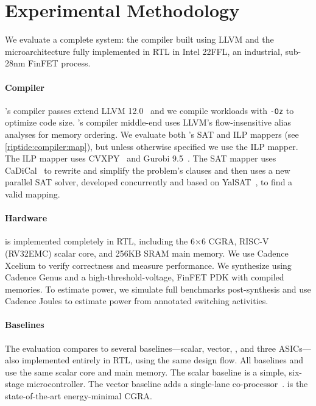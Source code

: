 \section{Experimental Methodology}
\label{riptide:method}

We evaluate a complete \riptide system: the compiler built using LLVM and the
microarchitecture fully implemented in RTL in Intel 22FFL,
an industrial, sub-28nm FinFET process.

\paragraph{Compiler}
\riptide's compiler passes extend LLVM 12.0~\cite{llvm} and we compile workloads with
\texttt{-Oz} to optimize code size.  
% 
\riptide's compiler middle-end uses LLVM's
flow-insensitive alias analyses for memory ordering.
%
We evaluate both \riptide's SAT and ILP mappers (see \autoref{riptide:compiler:map}), but unless otherwise specified we use the ILP mapper.
% 
The ILP mapper uses CVXPY~\cite{cvxpy} and Gurobi 9.5~\cite{gurobi}.
%
The SAT mapper uses CaDiCal~\cite{cadical} to rewrite and simplify the problem's clauses and then uses a new parallel SAT solver, developed concurrently and based on YalSAT~\cite{yalsat}, to find a valid mapping.

\paragraph{Hardware}
\label{method:hardware}
\riptide is implemented completely in RTL, including the 6$\times$6 CGRA, RISC-V
(RV32EMC) scalar core, and 256KB
SRAM main memory. 
% 
We use Cadence Xcelium to verify correctness and measure
performance.
% 
We synthesize \riptide using Cadence Genus and a
high-threshold-voltage, FinFET PDK with compiled memories.
% 
To estimate power, we simulate full benchmarks post-synthesis and use Cadence
Joules to estimate power from annotated switching activities.

\paragraph{Baselines}
The evaluation compares to several baselines---scalar, vector, \snafu, and
three ASICs---also implemented entirely in RTL, using the same design
flow.
% 
All baselines and \riptide use the same scalar core and main memory.
% 
The scalar baseline is a simple, six-stage microcontroller.
% 
The vector baseline adds a single-lane co-processor~\cite{manic}.
% 
\snafu is the state-of-the-art energy-minimal CGRA.

